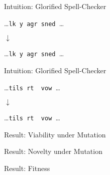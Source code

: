 \begin{frame}{Intuition: Glorified Spell-Checker}

\centering \Huge

\dots\texttt{lk y agr sned }\dots

$\downarrow$

\dots\texttt{lk y agr sned }\dots

\end{frame}


\begin{frame}{Intuition: Glorified Spell-Checker}

\centering \Huge

\dots\texttt{tils rt ~vow }\dots

$\downarrow$

\dots\texttt{tils rt ~vow }\dots

\end{frame}

\begin{frame}{Result: Viability under Mutation}



\end{frame}

\begin{frame}{Result: Novelty under Mutation}



\end{frame}

\begin{frame}{Result: Fitness}



\end{frame}
